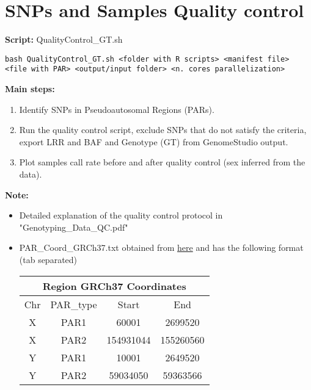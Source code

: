 \documentclass[11pt]{paper}
\begin{document}
\section{SNPs and Samples Quality control}
\textbf{Script:} QualityControl\_GT.sh
\begin{verbatim}
bash QualityControl_GT.sh <folder with R scripts> <manifest file> 
<file with PAR> <output/input folder> <n. cores parallelization>
\end{verbatim}
\textbf{Main steps:}
\begin{enumerate}
\item Identify SNPs in Pseudoautosomal Regions (PARs). 
\item Run the quality control script, exclude SNPs that do not satisfy the criteria, export LRR and BAF and Genotype (GT) from GenomeStudio output.
\item Plot samples call rate before and after quality control (sex inferred from the data). 
\end{enumerate}
\textbf{Note:}
\begin{itemize}
\item Detailed explanation of the quality control protocol in "Genotyping\_Data\_QC.pdf"
\item PAR\_Coord\_GRCh37.txt obtained from \href{https://www.ncbi.nlm.nih.gov/assembly/GCF_000001405.13/}{here} and has the following format (tab separated)
\begin{table}[!h]
\centering
\begin{tabular}{|c|c|c|c|}
\hline
\multicolumn{4}{|c|}{Region    GRCh37 Coordinates} \\ \hline
Chr    & PAR\_type    & Start        & End         \\ \hline
X      & PAR1         & 60001        & 2699520     \\ \hline
X      & PAR2         & 154931044    & 155260560   \\ \hline
Y      & PAR1         & 10001        & 2649520     \\ \hline
Y      & PAR2         & 59034050     & 59363566    \\ \hline
\end{tabular}
\end{table}
\end{itemize}
\end{document}
